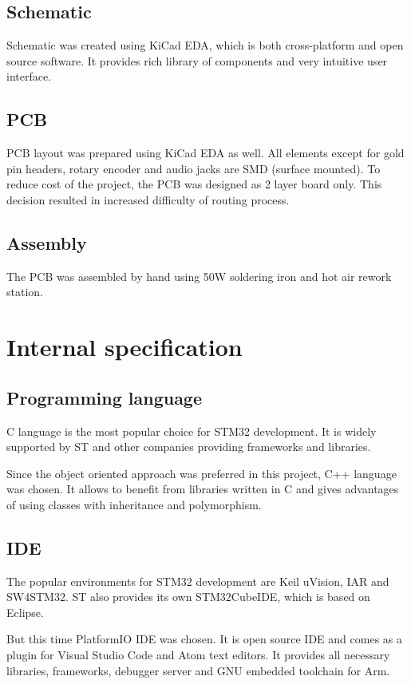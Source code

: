 \documentclass[a4paper,twoside,12pt]{book}
\begin{document}
\section{Schematic}
Schematic was created using KiCad EDA, which is both cross-platform and open source software.
It provides rich library of components and very intuitive user interface.

\section{PCB}
PCB layout was prepared using KiCad EDA as well.
All elements except for gold pin headers, rotary encoder and audio jacks are SMD (surface mounted).
To reduce cost of the project, the PCB was designed as 2 layer board only.
This decision resulted in increased difficulty of routing process.

\section{Assembly}
The PCB was assembled by hand using 50W soldering iron and hot air rework station.
\newpage



\chapter{Internal specification}

\section{Programming language}
C language is the most popular choice for STM32 development.
It is widely supported by ST and other companies providing frameworks and libraries. 

Since the object oriented approach was preferred in this project, C++ language was chosen.
It allows to benefit from libraries written in C and gives advantages of using classes with inheritance and polymorphism.

\section{IDE}
The popular environments for STM32 development are Keil uVision, IAR and SW4STM32.
ST also provides its own STM32CubeIDE, which is based on Eclipse.

But this time PlatformIO IDE was chosen.
It is open source IDE and comes as a plugin for Visual Studio Code and Atom text editors.
It provides all necessary libraries, frameworks, debugger server and GNU embedded toolchain for Arm.
\end{document}

